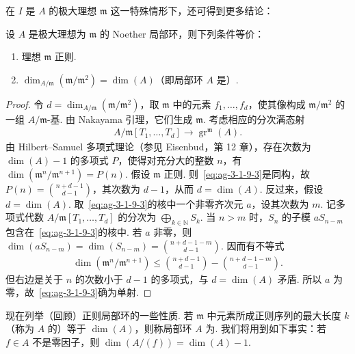 在 $I$ 是 $A$ 的极大理想 $\mathfrak m$ 这一特殊情形下，还可得到更多结论：
\begin{proposition}\label{item:ag-3-1-9}
设 $A$ 是极大理想为 $\mathfrak m$ 的 Noether 局部环，则下列条件等价：
\begin{enumerate}[label=\roman*)]
\item 理想 $\mathfrak m$ 正则.
\item $\dim_{A/\mathfrak m}(\mathfrak m/\mathfrak m^2)=\dim(A)$（即局部环 $A$ 是）.
\end{enumerate}
\end{proposition}
\begin{proof}
令 $d=\dim_{A/\mathfrak m}(\mathfrak m/\mathfrak m^2)$，取 $\mathfrak m$ 中的元素 $f_1,\ldots,f_d$，使其像构成 $\mathfrak m/\mathfrak m^2$ 的一组 $A/\mathfrak m$-基. 由 Nakayama 引理，它们生成 $\mathfrak m$. 考虑相应的分次满态射
\begin{align}
A/\mathfrak m[T_1,\ldots,T_d]\longrightarrow\operatorname{gr}^{\mathfrak m}(A).\tag{3.1.9.3}\label{eq:ag-3-1-9-3}
\end{align}
由 Hilbert--Samuel 多项式理论（参见 Eisenbud，第 12 章），存在次数为 $\dim(A)-1$ 的多项式 $P$，使得对充分大的整数 $n$，有 $\dim(\mathfrak m^n/\mathfrak m^{n+1})=P(n)$.
假设 $\mathfrak m$ 正则. 则~\eqref{eq:ag-3-1-9-3}是同构，故 $P(n)=\binom{n+d-1}{d-1}$，其次数为 $d-1$，从而 $d=\dim(A)$. 反过来，假设 $d=\dim(A)$. 取~\eqref{eq:ag-3-1-9-3}的核中一个非零齐次元 $a$，设其次数为 $m$. 记多项式代数 $A/\mathfrak m[T_1,\ldots,T_d]$ 的分次为 $\bigoplus_{k\in\mathbb N}S_k$. 当 $n>m$ 时，$S_n$ 的子模 $aS_{n-m}$ 包含在~\eqref{eq:ag-3-1-9-3}的核中. 若 $a$ 非零，则 $\dim(aS_{n-m})=\dim(S_{n-m})=\binom{n+d-1-m}{d-1}$. 因而有不等式
\begin{align*}
\dim(\mathfrak m^n/\mathfrak m^{n+1})\leqslant\binom{n+d-1}{d-1}-\binom{n+d-1-m}{d-1}.
\end{align*}
但右边是关于 $n$ 的次数小于 $d-1$ 的多项式，与 $d=\dim(A)$ 矛盾. 所以 $a$ 为零，故~\eqref{eq:ag-3-1-9-3}确为单射.
\end{proof}
现在列举（回顾）正则局部环的一些性质. 若 $\mathfrak m$ 中元素所成正则序列的最大长度 $k$（称为 $A$ 的）等于 $\dim(A)$，则称局部环 $A$ 为. 我们将用到如下事实：若 $f\in A$ 不是零因子，则 $\dim(A/(f))=\dim(A)-1$.
